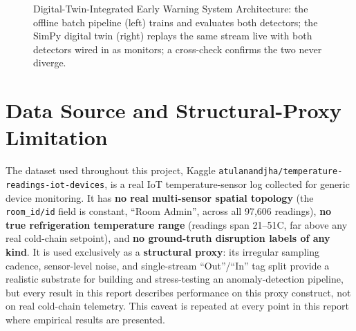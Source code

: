 \documentclass[11pt,a4paper,oneside]{report}
\begin{document}
\begin{figure}[H]
    \caption{Digital-Twin-Integrated Early Warning System Architecture: the offline batch pipeline (left) trains and evaluates both detectors; the SimPy digital twin (right) replays the same stream live with both detectors wired in as monitors; a cross-check confirms the two never diverge.}
    \label{fig:system_architecture}
\end{figure}

\section{Data Source and Structural-Proxy Limitation}
\label{sec:data_source}

\begin{proxynotice}
\raggedright
The dataset used throughout this project, Kaggle \texttt{atulanandjha/\allowbreak temperature-readings-\allowbreak iot-devices}, is a real IoT temperature-sensor log collected for generic device monitoring. It has \textbf{no real multi-sensor spatial topology} (the \texttt{room\_id/id} field is constant, \enquote{Room Admin}, across all 97,606 readings), \textbf{no true refrigeration temperature range} (readings span 21--51\textdegree{}C, far above any real cold-chain setpoint), and \textbf{no ground-truth disruption labels of any kind}. It is used exclusively as a \textbf{structural proxy}: its irregular sampling cadence, sensor-level noise, and single-stream \enquote{Out}/\enquote{In} tag split provide a realistic substrate for building and stress-testing an anomaly-detection pipeline, but every result in this report describes performance on this proxy construct, not on real cold-chain telemetry. This caveat is repeated at every point in this report where empirical results are presented.
\end{proxynotice}
\end{document}
